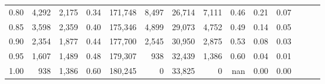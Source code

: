\begin{tabular}{rrrrrrrrrrrrrr}
0.80 &   4,292 &  2,175 &  0.34 &  171,748 &    8,497 &  26,714 &   7,111 &  0.46 &  0.21 &      0.07 \\
0.85 &   3,598 &  2,359 &  0.40 &  175,346 &    4,899 &  29,073 &   4,752 &  0.49 &  0.14 &      0.05 \\
0.90 &   2,354 &  1,877 &  0.44 &  177,700 &    2,545 &  30,950 &   2,875 &  0.53 &  0.08 &      0.03 \\
0.95 &   1,607 &  1,489 &  0.48 &  179,307 &      938 &  32,439 &   1,386 &  0.60 &  0.04 &      0.01 \\
1.00 &     938 &  1,386 &  0.60 &  180,245 &        0 &  33,825 &       0 &   nan &  0.00 &      0.00 \\
\bottomrule
\end{tabular}
